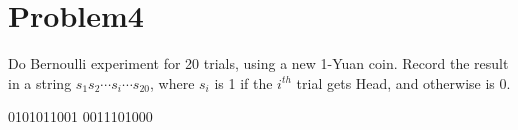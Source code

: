 \documentclass[12pt]{article}
\begin{document}
\section{Problem4}
Do Bernoulli experiment for 20 trials, using a new 1-Yuan coin. Record the result in a
string $s_1s_2 \cdots s_i \cdots s_{20}$, where $s_i$ is 1 if the $i^{th}$ trial gets Head, and otherwise is 0.

0101011001 0011101000
\end{document}
